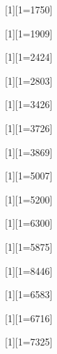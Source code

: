 \newcommand{\NIII}{\semiforbiddenEL[N][iii]}
[1][1=1750]{\semiforbiddenEL[N][iii][\textlambda][#1]}
\newcommand{\NIIIall}{\semiforbiddenEL[N][iii][\textlambda][\textlambda][1747--][1754]}

[1][1=1909]{\semiforbiddenEL[C][iii][\textlambda][#1]}
\newcommand{\CIIIall}{\semiforbiddenEL[C][iii][\textlambda][\textlambda][1907,][1909]}

\newcommand{\NeIV}{\forbiddenEL[Ne][iv]}
[1][1=2424]{\forbiddenEL[Ne][iv][\textlambda][#1]}
\newcommand{\NeIVall}{\forbiddenEL[Ne][iv][\textlambda][\textlambda][2422,][2424]}

\newcommand{\MgII}{\permittedEL[Mg][ii]}
[1][1=2803]{\permittedEL[Mg][ii][\textlambda][#1]}
\newcommand{\MgIIall}{\permittedEL[Mg][ii][\textlambda][\textlambda][2796,][2803]}

\newcommand{\NeV}{\forbiddenEL[Ne][v]}
[1][1=3426]{\forbiddenEL[Ne][v][\textlambda][#1]}
\newcommand{\NeVall}{\forbiddenEL[Ne][v][\textlambda][\textlambda][3346,][3426]}


\newcommand{\OII}{\forbiddenEL[O][ii]}
[1][1=3726]{\forbiddenEL[O][ii][\textlambda][#1]}
\newcommand{\OIIall}{\forbiddenEL[O][ii][\textlambda][\textlambda][3726,][3729]}

\newcommand{\NeIII}{\forbiddenEL[Ne][iii]}
[1][1=3869]{\forbiddenEL[Ne][iii][\textlambda][#1]}
\newcommand{\NeIIIall}{\forbiddenEL[Ne][iii][\textlambda][\textlambda][3869,][3967]}

\newcommand{\OIII}{\forbiddenEL[O][iii]}
[1][1=5007]{\forbiddenEL[O][iii][\textlambda][#1]}
\newcommand{\OIIIall}{\forbiddenEL[O][iii][\textlambda][\textlambda][4959,][5007]}

[1][1=5200]{\forbiddenEL[N][i][\textlambda][#1]}
\newcommand{\NIall}{\forbiddenEL[N][i][\textlambda][\textlambda][5198,][5200]}

\newcommand{\OI}{\forbiddenEL[O][i]}
[1][1=6300]{\forbiddenEL[O][i][\textlambda][#1]}
\newcommand{\OIall}{\forbiddenEL[O][i][\textlambda][\textlambda][6300,][6364]}

\newcommand{\HeI}{\permittedEL[He][i]}
[1][1=5875]{\permittedEL[He][i][\textlambda][#1]}

\newcommand{\OIres}{\permittedEL[O][i]}
[1][1=8446]{\permittedEL[O][i][\textlambda][#1]}

\newcommand{\NII}{\forbiddenEL[N][ii]}
[1][1=6583]{\forbiddenEL[N][ii][\textlambda][#1]}
\newcommand{\NIIall}{\forbiddenEL[N][ii][\textlambda][\textlambda][6548,][6583]}

\newcommand{\SII}{\forbiddenEL[S][ii]}
[1][1=6716]{\forbiddenEL[S][ii][\textlambda][#1]}
\newcommand{\SIIall}{\forbiddenEL[S][ii][\textlambda][\textlambda][6716,][6731]}

[1][1=7325]{\forbiddenEL[O][ii][\textlambda][#1]}
\newcommand{\OIIAuall}{\forbiddenEL[O][ii][\textlambda][\textlambda][7319--][7331]}

